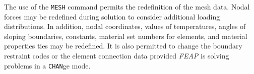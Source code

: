 \headb

The use of the {\tt MESH} command permits the redefinition
of the mesh data.  Nodal forces may be
redefined during solution to consider additional
loading distributions.  In addition, nodal coordinates,
values of temperatures, angles of sloping boundaries, constants,
material set numbers for elements, and material properties
ties may be redefined.  It is also permitted to change the
boundary restraint codes or the element connection data provided {\sl FEAP}
is solving problems in a {\tt CHAN}ge mode.
\vfill\eject
